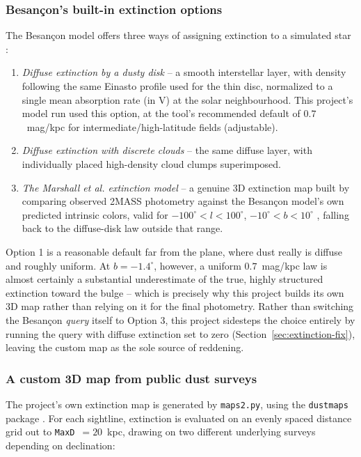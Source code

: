 \documentclass[english,10pt,a4paper]{article}
\begin{document}
	\subsubsection{Besan\c{c}on's built-in extinction options}
	
	The Besan\c{c}on model offers three ways of assigning extinction to a simulated star \cite{Robin2003Besancon}:
	
	\begin{enumerate}
		\item \textit{Diffuse extinction by a dusty disk} -- a smooth interstellar layer, with density following the same Einasto profile used for the thin disc, normalized to a single mean absorption rate (in V) at the solar neighbourhood. This project's model run used this option, at the tool's recommended default of $0.7$~mag/kpc for intermediate/high-latitude fields (adjustable).
		\item \textit{Diffuse extinction with discrete clouds} -- the same diffuse layer, with individually placed high-density cloud clumps superimposed.
		\item \textit{The Marshall et al. extinction model} -- a genuine 3D extinction map built by comparing observed 2MASS photometry against the Besan\c{c}on model's own predicted intrinsic colors, valid for $-100^{\circ}<l<100^{\circ}$, $-10^{\circ}<b<10^{\circ}$ \cite{Marshall2006Extinction}, falling back to the diffuse-disk law outside that range.
	\end{enumerate}
	
	Option 1 is a reasonable default far from the plane, where dust really is diffuse and roughly uniform. At $b=-1.4^{\circ}$, however, a uniform $0.7$~mag/kpc law is almost certainly a substantial underestimate of the true, highly structured extinction toward the bulge -- which is precisely why this project builds its own 3D map rather than relying on it for the final photometry. Rather than switching the Besan\c{c}on \emph{query} itself to Option 3, this project sidesteps the choice entirely by running the query with diffuse extinction set to zero (Section~\ref{sec:extinction-fix}), leaving the custom map as the sole source of reddening.
	
	\subsubsection{A custom 3D map from public dust surveys}
	
	The project's own extinction map is generated by \texttt{maps2.py}, using the \texttt{dustmaps} package \cite{Green2018Dustmaps}. For each sightline, extinction is evaluated on an evenly spaced distance grid out to \texttt{MaxD}~$=20$~kpc, drawing on two different underlying surveys depending on declination:
	
\end{document}
